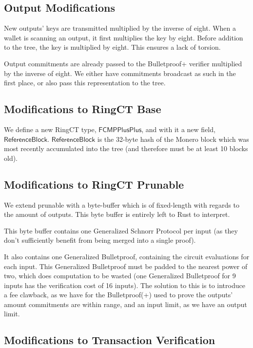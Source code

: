 \documentclass[]{article}
\begin{document}
\subsection{Output Modifications}

New outputs' keys are transmitted multiplied by the inverse of eight. When a wallet is scanning an output, it first multiplies the key by eight. Before addition to the tree, the key is multiplied by eight. This ensures a lack of torsion.

Output commitments are already passed to the Bulletproof+ verifier multiplied by the inverse of eight. We either have commitments broadcast as such in the first place, or also pass this representation to the tree.

\subsection{Modifications to RingCT Base}

We define a new RingCT type, $\mathsf{FCMPPlusPlus}$, and with it a new field, $\mathsf{ReferenceBlock}$. $\mathsf{ReferenceBlock}$ is the 32-byte hash of the Monero block which was most recently accumulated into the tree (and therefore must be at least 10 blocks old).

\subsection{Modifications to RingCT Prunable}

We extend prunable with a byte-buffer which is of fixed-length with regards to the amount of outputs. This byte buffer is entirely left to Rust to interpret.

This byte buffer contains one Generalized Schnorr Protocol per input (as they don't sufficiently benefit from being merged into a single proof).

It also contains one Generalized Bulletproof, containing the circuit evaluations for each input. This Generalized Bulletproof must be padded to the nearest power of two, which does computation to be wasted (one Generalized Bulletproof for 9 inputs has the verification cost of 16 inputs). The solution to this is to introduce a fee clawback, as we have for the Bulletproof(+) used to prove the outputs' amount commitments are within range, and an input limit, as we have an output limit.

\subsection{Modifications to Transaction Verification}
\end{document}
